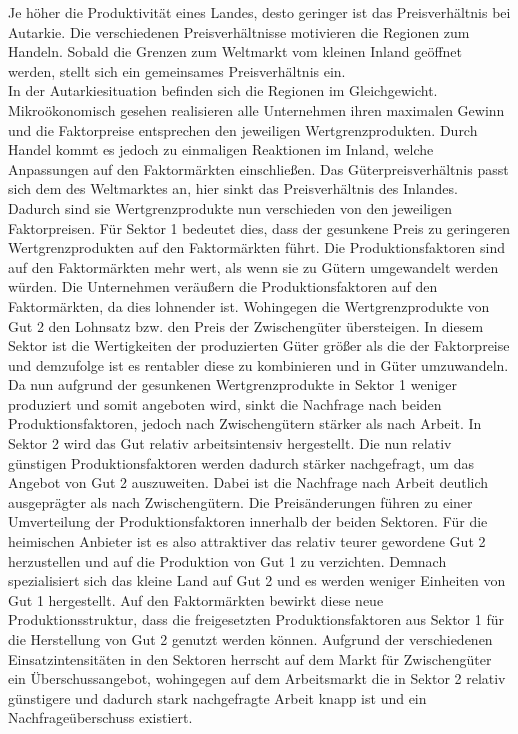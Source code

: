 Je höher die Produktivität eines Landes, desto geringer ist das Preisverhältnis bei Autarkie. Die verschiedenen Preisverhältnisse motivieren die Regionen zum Handeln. Sobald die Grenzen zum Weltmarkt vom kleinen Inland geöffnet werden, stellt sich ein gemeinsames  Preisverhältnis ein.\\
In der Autarkiesituation befinden sich die Regionen im Gleichgewicht. Mikroökonomisch gesehen realisieren alle Unternehmen ihren maximalen Gewinn und die Faktorpreise  entsprechen den jeweiligen Wertgrenzprodukten. Durch Handel kommt es jedoch zu einmaligen Reaktionen im Inland, welche Anpassungen auf den Faktormärkten einschlie{\ss}en. Das Güterpreisverhältnis passt sich dem des Weltmarktes an, hier sinkt das Preisverhältnis des Inlandes. Dadurch sind sie Wertgrenzprodukte nun verschieden von den jeweiligen Faktorpreisen. Für Sektor 1 bedeutet dies, dass der gesunkene Preis zu geringeren Wertgrenzprodukten auf den Faktormärkten führt. Die Produktionsfaktoren sind auf den Faktormärkten mehr wert, als wenn sie zu Gütern umgewandelt werden würden. Die Unternehmen veräu{\ss}ern die Produktionsfaktoren auf den Faktormärkten, da dies lohnender ist. Wohingegen die Wertgrenzprodukte von Gut 2 den Lohnsatz bzw. den Preis der Zwischengüter übersteigen. In diesem Sektor ist die Wertigkeiten der produzierten Güter grö{\ss}er als die der Faktorpreise und demzufolge ist es rentabler diese zu kombinieren und in Güter umzuwandeln. Da nun aufgrund der gesunkenen Wertgrenzprodukte in Sektor 1 weniger produziert und somit angeboten wird, sinkt die Nachfrage nach beiden Produktionsfaktoren, jedoch nach Zwischengütern stärker als nach Arbeit. In Sektor 2 wird das Gut relativ arbeitsintensiv hergestellt. Die nun relativ günstigen Produktionsfaktoren werden dadurch stärker nachgefragt, um das Angebot von Gut 2 auszuweiten. Dabei ist die Nachfrage nach Arbeit deutlich ausgeprägter als nach Zwischengütern. Die Preisänderungen führen zu einer Umverteilung der Produktionsfaktoren innerhalb der beiden Sektoren. Für die heimischen Anbieter ist es also attraktiver das relativ teurer gewordene Gut 2 herzustellen und auf die Produktion von Gut 1 zu verzichten. Demnach spezialisiert sich das kleine Land auf Gut 2 und es werden weniger Einheiten von Gut 1 hergestellt. Auf den Faktormärkten bewirkt diese neue Produktionsstruktur, dass die freigesetzten Produktionsfaktoren aus Sektor 1 für die Herstellung von Gut 2 genutzt werden können. Aufgrund der verschiedenen Einsatzintensitäten in den Sektoren herrscht auf dem Markt für Zwischengüter ein Überschussangebot, wohingegen auf dem Arbeitsmarkt die in Sektor 2 relativ günstigere und dadurch stark nachgefragte Arbeit knapp ist und ein Nachfrageüberschuss existiert.\\



